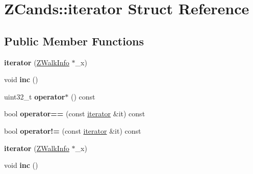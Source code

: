 \hypertarget{structZCands_1_1iterator}{\section{Z\-Cands\-:\-:iterator Struct Reference}
\label{structZCands_1_1iterator}
}
\subsection*{Public Member Functions}
\begin{DoxyCompactItemize}
\item 
\hypertarget{structZCands_1_1iterator_a4b4548639cc7d99650327cb52c4edc3c}{{\bfseries iterator} (\hyperlink{structZWalkInfo}{Z\-Walk\-Info} $\ast$\-\_\-x)}\label{structZCands_1_1iterator_a4b4548639cc7d99650327cb52c4edc3c}

\item 
\hypertarget{structZCands_1_1iterator_a0ef9934aac0a47a26a6668b50af02c48}{void {\bfseries inc} ()}\label{structZCands_1_1iterator_a0ef9934aac0a47a26a6668b50af02c48}

\item 
\hypertarget{structZCands_1_1iterator_a93386f66f4e54d43b4176b95687a37fa}{uint32\-\_\-t {\bfseries operator$\ast$} () const }\label{structZCands_1_1iterator_a93386f66f4e54d43b4176b95687a37fa}

\item 
\hypertarget{structZCands_1_1iterator_a0a5289939bdd7ecb218004dc120018d0}{bool {\bfseries operator==} (const \hyperlink{structZCands_1_1iterator}{iterator} \&it) const }\label{structZCands_1_1iterator_a0a5289939bdd7ecb218004dc120018d0}

\item 
\hypertarget{structZCands_1_1iterator_a2186c9225865a44ee9fd447edbef860b}{bool {\bfseries operator!=} (const \hyperlink{structZCands_1_1iterator}{iterator} \&it) const }\label{structZCands_1_1iterator_a2186c9225865a44ee9fd447edbef860b}

\item 
\hypertarget{structZCands_1_1iterator_a4b4548639cc7d99650327cb52c4edc3c}{{\bfseries iterator} (\hyperlink{structZWalkInfo}{Z\-Walk\-Info} $\ast$\-\_\-x)}\label{structZCands_1_1iterator_a4b4548639cc7d99650327cb52c4edc3c}

\item 
\hypertarget{structZCands_1_1iterator_a0ef9934aac0a47a26a6668b50af02c48}{void {\bfseries inc} ()}\label{structZCands_1_1iterator_a0ef9934aac0a47a26a6668b50af02c48}


\end{DoxyCompactItemize}
